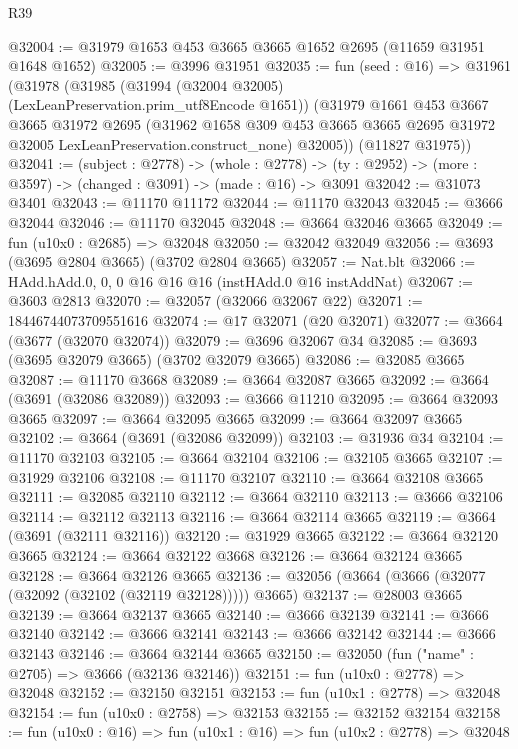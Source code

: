\begin{lexlean}{R39}
\begin{coremodule}
@32004 := @31979 @1653 @453 @3665 @3665 @1652 @2695 (@11659 @31951 @1648 @1652)
@32005 := @3996 @31951
@32035 := fun (seed : @16) =>
  @31961
    (@31978
      (@31985
        (@31994 (@32004 @32005) (LexLeanPreservation.prim_utf8Encode @1651))
        (@31979
          @1661
          @453
          @3667
          @3665
          @31972
          @2695
          (@31962
            @1658
            @309
            @453
            @3665
            @3665
            @2695
            @31972
            @32005
            LexLeanPreservation.construct_none)
          @32005))
      (@11827 @31975))
@32041 := (subject : @2778) ->
  (whole : @2778) -> (ty : @2952) -> (more : @3597) -> (changed : @3091) -> (made : @16) -> @3091
@32042 := @31073 @3401
@32043 := @11170 @11172
@32044 := @11170 @32043
@32045 := @3666 @32044
@32046 := @11170 @32045
@32048 := @3664 @32046 @3665
@32049 := fun (u10x0 : @2685) => @32048
@32050 := @32042 @32049
@32056 := @3693 (@3695 @2804 @3665) (@3702 @2804 @3665)
@32057 := Nat.blt
@32066 := HAdd.hAdd.{0, 0, 0} @16 @16 @16 (instHAdd.{0} @16 instAddNat)
@32067 := @3603 @2813
@32070 := @32057 (@32066 @32067 @22)
@32071 := 18446744073709551616
@32074 := @17 @32071 (@20 @32071)
@32077 := @3664 (@3677 (@32070 @32074))
@32079 := @3696 @32067 @34
@32085 := @3693 (@3695 @32079 @3665) (@3702 @32079 @3665)
@32086 := @32085 @3665
@32087 := @11170 @3668
@32089 := @3664 @32087 @3665
@32092 := @3664 (@3691 (@32086 @32089))
@32093 := @3666 @11210
@32095 := @3664 @32093 @3665
@32097 := @3664 @32095 @3665
@32099 := @3664 @32097 @3665
@32102 := @3664 (@3691 (@32086 @32099))
@32103 := @31936 @34
@32104 := @11170 @32103
@32105 := @3664 @32104
@32106 := @32105 @3665
@32107 := @31929 @32106
@32108 := @11170 @32107
@32110 := @3664 @32108 @3665
@32111 := @32085 @32110
@32112 := @3664 @32110
@32113 := @3666 @32106
@32114 := @32112 @32113
@32116 := @3664 @32114 @3665
@32119 := @3664 (@3691 (@32111 @32116))
@32120 := @31929 @3665
@32122 := @3664 @32120 @3665
@32124 := @3664 @32122 @3668
@32126 := @3664 @32124 @3665
@32128 := @3664 @32126 @3665
@32136 := @32056 (@3664 (@3666 (@32077 (@32092 (@32102 (@32119 @32128))))) @3665)
@32137 := @28003 @3665
@32139 := @3664 @32137 @3665
@32140 := @3666 @32139
@32141 := @3666 @32140
@32142 := @3666 @32141
@32143 := @3666 @32142
@32144 := @3666 @32143
@32146 := @3664 @32144 @3665
@32150 := @32050 (fun ("name" : @2705) => @3666 (@32136 @32146))
@32151 := fun (u10x0 : @2778) => @32048
@32152 := @32150 @32151
@32153 := fun (u10x1 : @2778) => @32048
@32154 := fun (u10x0 : @2758) => @32153
@32155 := @32152 @32154
@32158 := fun (u10x0 : @16) => fun (u10x1 : @16) => fun (u10x2 : @2778) => @32048

\end{coremodule}
\end{lexlean}
